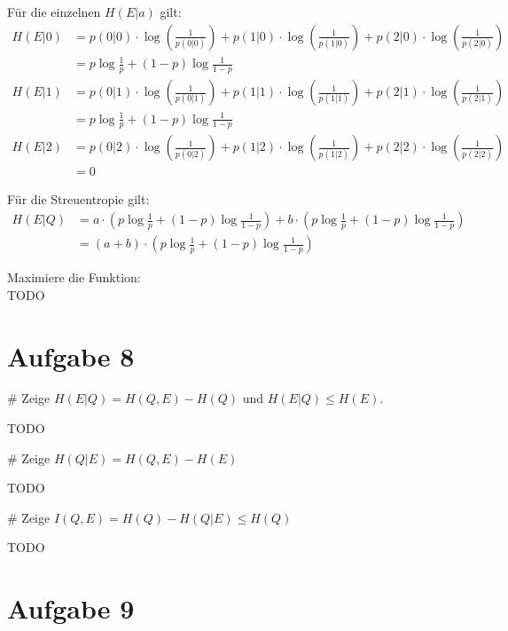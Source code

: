 \begin{myList}
Für die einzelnen $H(E|a)$ gilt:
\begin{align*}
	H(E|0) &= p(0|0) \cdot \log \left(\frac{1}{p(0|0)} \right) + p(1|0) \cdot \log \left(\frac{1}{p(1|0)} \right) + p(2|0) \cdot \log \left(\frac{1}{p(2|0)} \right)\\
	&= p\log \frac{1}{p} + (1-p) \log \frac{1}{1-p}\\
	H(E|1) &= p(0|1) \cdot \log \left(\frac{1}{p(0|1)} \right) + p(1|1) \cdot \log \left(\frac{1}{p(1|1)} \right) + p(2|1) \cdot \log \left(\frac{1}{p(2|1)} \right)\\
	&= p\log \frac{1}{p} + (1-p) \log \frac{1}{1-p}\\
	H(E|2) &= p(0|2) \cdot \log \left(\frac{1}{p(0|2)} \right) + p(1|2) \cdot \log \left(\frac{1}{p(1|2)} \right) + p(2|2) \cdot \log \left(\frac{1}{p(2|2)} \right) \\
	&= 0
\end{align*}

Für die Streuentropie gilt:
\begin{align*}
	H(E|Q) &= a \cdot (p\log \frac{1}{p} + (1-p) \log \frac{1}{1-p}) + b \cdot (p\log \frac{1}{p} + (1-p) \log \frac{1}{1-p}) \\
	&= (a+b) \cdot (p\log \frac{1}{p} + (1-p) \log \frac{1}{1-p})
\end{align*}

Maximiere die Funktion:\\
TODO
\end{myList}

\section*{Aufgabe 8}
\begin{myList}
#
Zeige $H(E|Q) = H(Q,E) - H(Q)$ und $H(E|Q) \leq H(E)$.

TODO

#
Zeige $H(Q|E) = H(Q,E) - H(E)$

TODO

#
Zeige $I(Q,E) = H(Q) - H(Q|E) \leq H(Q)$

TODO

\end{myList}

\section*{Aufgabe 9}

